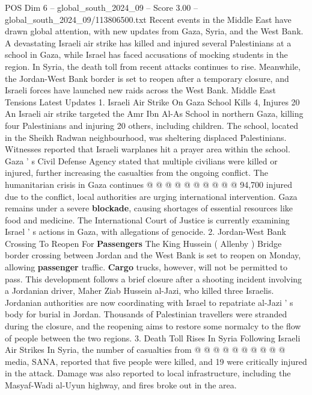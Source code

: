 \begin{textsample}{POS Dim 6 – global\_south\_2024\_09 – Score 3.00 – global\_south\_2024\_09/113806500.txt}  \label{ex:f6_pos_422}
Recent events in the Middle East have drawn global attention, with new updates from Gaza, Syria, and the West Bank.
A devastating Israeli air strike has killed and injured several Palestinians at a school in Gaza, while Israel has faced accusations of mocking students in the region.
In Syria, the death toll from recent attacks continues to rise.
Meanwhile, the Jordan-West Bank border is set to reopen after a temporary closure, and Israeli forces have launched new raids across the West Bank.
Middle East Tensions Latest Updates 1.
Israeli Air Strike On Gaza School Kills 4, Injures 20 An Israeli air strike targeted the Amr Ibn Al-As School in northern Gaza, killing four Palestinians and injuring 20 others, including children.
The school, located in the Sheikh Radwan neighbourhood, was sheltering displaced Palestinians.
Witnesses reported that Israeli warplanes hit a prayer area within the school.
Gaza ' s Civil Defense Agency stated that multiple civilians were killed or injured, further increasing the casualties from the ongoing conflict.
The humanitarian crisis in Gaza continues @ @ @ @ @ @ @ @ @ @ 94,700 injured due to the conflict, local authorities are urging international intervention.
Gaza remains under a severe \textbf{blockade}, causing shortages of essential resources like food and medicine.
The International Court of Justice is currently examining Israel ' s actions in Gaza, with allegations of genocide. 2.
Jordan-West Bank Crossing To Reopen For \textbf{Passengers} The King Hussein ( Allenby ) Bridge border crossing between Jordan and the West Bank is set to reopen on Monday, allowing \textbf{passenger} traffic. \textbf{Cargo} trucks, however, will not be permitted to pass.
This development follows a brief closure after a shooting incident involving a Jordanian driver, Maher Ziab Hussein al-Jazi, who killed three Israelis.
Jordanian authorities are now coordinating with Israel to repatriate al-Jazi ' s body for burial in Jordan.
Thousands of Palestinian travellers were stranded during the closure, and the reopening aims to restore some normalcy to the flow of people between the two regions. 3.
Death Toll Rises In Syria Following Israeli Air Strikes In Syria, the number of casualties from @ @ @ @ @ @ @ @ @ @ media, SANA, reported that five people were killed, and 19 were critically injured in the attack.
Damage was also reported to local infrastructure, including the Masyaf-Wadi al-Uyun highway, and fires broke out in the area.

\end{textsample}
